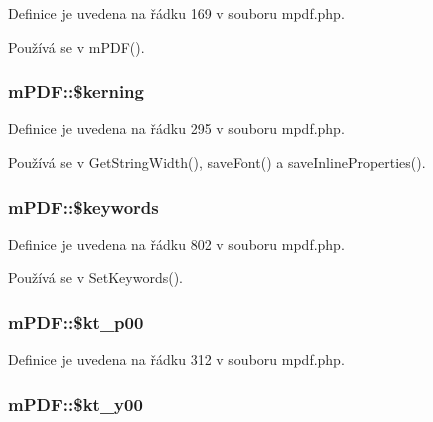 Definice je uvedena na řádku 169 v souboru mpdf.\-php.



Používá se v m\-P\-D\-F().

\hypertarget{classm_p_d_f_a265803e76ed64c766fd64e26ace16d20}{
\subsubsection[{\$kerning}]{\setlength{\rightskip}{0pt plus 5cm}m\-P\-D\-F\-::\$kerning}}\label{classm_p_d_f_a265803e76ed64c766fd64e26ace16d20}


Definice je uvedena na řádku 295 v souboru mpdf.\-php.



Používá se v Get\-String\-Width(), save\-Font() a save\-Inline\-Properties().

\hypertarget{classm_p_d_f_a3089c13fc620ae6a08899c1e764662d6}{
\subsubsection[{\$keywords}]{\setlength{\rightskip}{0pt plus 5cm}m\-P\-D\-F\-::\$keywords}}\label{classm_p_d_f_a3089c13fc620ae6a08899c1e764662d6}


Definice je uvedena na řádku 802 v souboru mpdf.\-php.



Používá se v Set\-Keywords().

\hypertarget{classm_p_d_f_a138f0ae6aa151267e48cc91f92e1a165}{
\subsubsection[{\$kt\-\_\-p00}]{\setlength{\rightskip}{0pt plus 5cm}m\-P\-D\-F\-::\$kt\-\_\-p00}}\label{classm_p_d_f_a138f0ae6aa151267e48cc91f92e1a165}


Definice je uvedena na řádku 312 v souboru mpdf.\-php.

\hypertarget{classm_p_d_f_a5dd273db4eed089cba6c73cf0540ae8b}{
\subsubsection[{\$kt\-\_\-y00}]{\setlength{\rightskip}{0pt plus 5cm}m\-P\-D\-F\-::\$kt\-\_\-y00}}\label{classm_p_d_f_a5dd273db4eed089cba6c73cf0540ae8b}


